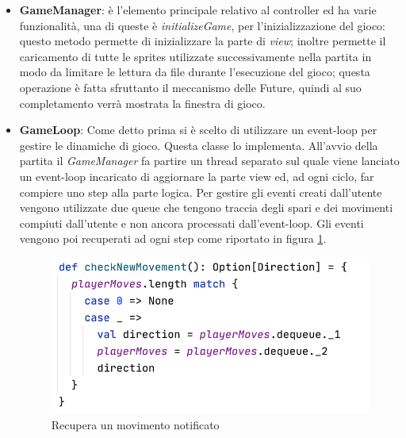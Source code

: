  \begin{itemize}
     \item  \textbf{GameManager}: è l'elemento principale relativo al controller ed ha varie funzionalità, una di queste è \textit{initializeGame}, per l'inizializzazione del gioco: questo metodo permette di inizializzare la parte di \textit{view}; inoltre permette il caricamento di tutte le sprites utilizzate successivamente nella partita in modo da limitare le lettura da file durante l'esecuzione del gioco; questa operazione è fatta sfruttanto il meccanismo delle Future, quindi al suo completamento verrà mostrata la finestra di gioco.
     
     \item \textbf{GameLoop}: Come detto prima si è scelto di utilizzare un event-loop per gestire le dinamiche di gioco. Questa classe lo implementa. All'avvio della partita il \textit{GameManager} fa partire un thread separato sul quale viene lanciato un event-loop incaricato di aggiornare la parte view ed, ad ogni ciclo, far compiere uno step alla parte logica.
    Per gestire gli eventi creati dall'utente vengono utilizzate due queue che tengono traccia degli spari e dei movimenti compiuti dall'utente e non ancora processati dall'event-loop. Gli eventi vengono poi recuperati ad ogni step come riportato in figura \ref{checknewMovement}.
    
    \begin{figure}[H]
      \includegraphics[width=13cm]{res/checkNewMovement.png}
      \caption{Recupera un movimento notificato}
      \label{checknewMovement}
    \end{figure}


\end{itemize}
